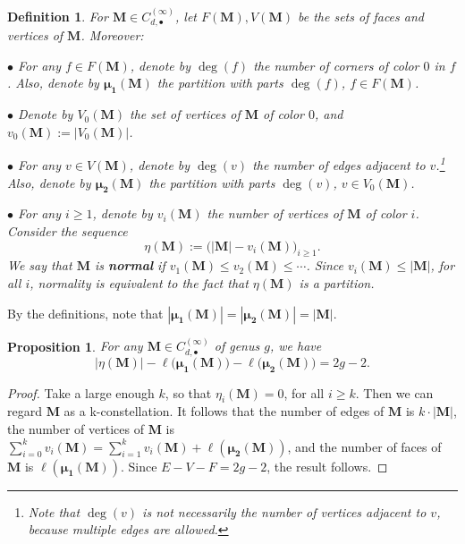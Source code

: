 \documentclass[11pt]{article}
\theoremstyle{plain}
\newtheorem{proposition}[lemma]{Proposition}
\newtheorem{definition}[lemma]{Definition}
\newcommand{\MM}{\mathbf M}
\begin{document}
\begin{definition}\label{def:dataconstellation}
For $\MM\in C_{d,\bullet}^{(\infty)}$, let $F(\MM), V(\MM)$ be the sets of faces and vertices of $\MM$. Moreover:

    $\bullet$ For any $f\in F(\MM)$, denote by $\deg(f)$ the number of corners of color $0$ in $f$. Also, denote by $\pmb{\mu_1}(\MM)$ the partition with parts $\deg(f)$, $f\in F(\MM)$.

\smallskip

    $\bullet$ Denote by $V_0(\MM)$ the set of vertices of $\MM$ of color $0$, and $v_0(\MM):=|V_0(\MM)|$.

\smallskip

    $\bullet$ For any $v\in V(\MM)$, denote by $\deg(v)$ the number of edges adjacent to $v$.\footnote{Note that $\deg(v)$ is not necessarily the number of vertices adjacent to $v$, because multiple edges are allowed.} Also, denote by $\pmb{\mu_2}(\MM)$ the partition with parts $\deg(v)$, $v\in V_0(\MM)$.

\smallskip
    
    $\bullet$ For any $i\ge 1$, denote by $v_i(\MM)$ the number of vertices of $\MM$ of color $i$.
    Consider the sequence $$\eta(\MM):=\big(|\MM|-v_i(\MM)\big)_{i\ge 1}.$$
We say that $\MM$ is \textbf{normal} if $v_1(\MM)\le v_2(\MM)\le\cdots$.
Since $v_i(\MM)\le|\MM|$, for all $i$, normality is equivalent to the fact that $\eta(\MM)$ is a partition.
\end{definition}


\noindent By the definitions, note that $|\pmb{\mu_{1}}(\MM)|=|\pmb{\mu_{2}}(\MM)|=|\MM|$.

\begin{proposition}\cite[Eqn. (5)]{CD}\label{prop:euler}
    For any $\MM\in C_{d,\bullet}^{(\infty)}$ of genus $g$, we have
\begin{equation}
    |\eta(\MM)|-\ell\big(\pmb{\mu_1}(\MM)\big) -\ell\big(\pmb{\mu_2}(\MM)\big) = 2g-2.
\end{equation}
\end{proposition}

\begin{proof}
    Take a large enough $k$, so that $\eta_i(\MM)=0$, for all $i\ge k$. Then we can regard $\MM$ as a k-constellation. It follows that the number of edges of $\MM$ is $k\cdot |\MM|$, the number of vertices of $\MM$ is $\sum_{i=0}^k{v_i(\MM)} = \sum_{i=1}^k{v_i(\MM)}+\ell(\pmb{\mu_2}(\MM))$, and the number of faces of $\MM$ is $\ell(\pmb{\mu_1}(\MM))$. Since $E-V-F=2g-2$, the result follows.
\end{proof}
\end{document}
